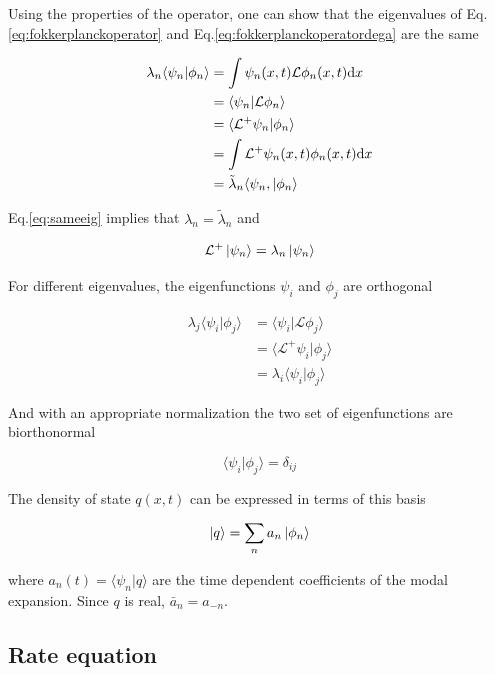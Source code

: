 \documentclass[12pt,twoside]{report}
\def \dd  {{\rm d}}
\begin{document}
Using the properties of the operator, one can show that the eigenvalues of Eq.\eqref{eq:fokkerplanckoperator} and Eq.\eqref{eq:fokkerplanckoperatordega} are the same

\begin{align}
\lambda_n\langle\psi_n|\phi_n\rangle &=\int\psi_n(x,t)\mathcal{L}\phi_n(x,t)\dd x  \nonumber \\
&=\langle\psi_n|\mathcal{L}\phi_n\rangle \nonumber \\
&=\langle\mathcal{L}^+\psi_n|\phi_n\rangle  \nonumber \\
&=\int\mathcal{L}^+\psi_n(x,t)\phi_n(x,t)\dd x \nonumber \\
&=\tilde{\lambda}_n\langle\psi_n,|\phi_n\rangle \label{eq:sameeig}
\end{align}

Eq.\eqref{eq:sameeig} implies that $\lambda_n=\tilde{\lambda}_n$ and

\begin{equation}
\label{eq:fokkerplanckoperatordega2}
\mathcal{L}^+\ket{\psi_n}=\lambda_n\ket{\psi_n}
\end{equation}

For different eigenvalues, the eigenfunctions $\psi_i$ and $\phi_j$ are orthogonal

\begin{align}
\lambda_j\langle\psi_i|\phi_j\rangle
&=\langle\psi_i|\mathcal{L}\phi_j\rangle \nonumber \\
&=\langle\mathcal{L}^+\psi_i|\phi_j\rangle  \nonumber \\
&=\lambda_i\langle\psi_i|\phi_j\rangle \label{eq:lorthogonal}
\end{align}

And with an appropriate normalization the two set of eigenfunctions are biorthonormal

\begin{equation}
\label{eq:dij}
\langle\psi_i|\phi_j\rangle=\delta_{ij}
\end{equation}

The density of state $q(x,t)$ can be expressed in terms of this basis

\begin{equation}
\label{eq:p}
\ket{q}=\sum_na_n\ket{\phi_n}
\end{equation}

where $a_n(t)=\langle \psi_n | q\rangle$ are the time dependent coefficients of the modal expansion. Since $q$ is real, $\bar{a}_n=a_{-n}$.


\subsection{Rate equation}
\end{document}
